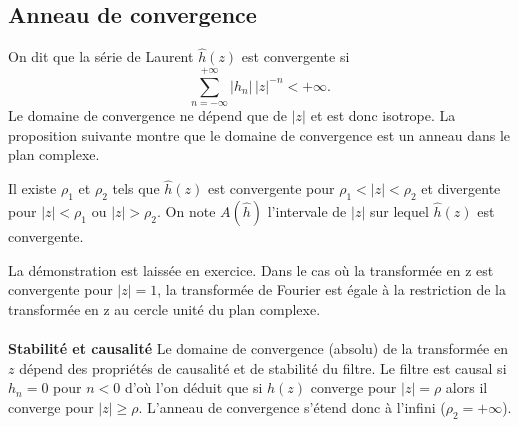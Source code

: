 \subsection{Anneau de convergence}
On dit que la s\'erie de Laurent $\hat h(z)$ est convergente si
\[
\sum_{n=-\infty}^{+\infty} |h_n|\, |z|^{-n} < + \infty .
\]
Le domaine de convergence ne d\'epend que de $|z|$ et est donc
isotrope. La proposition suivante
montre
que le domaine de convergence est un anneau dans le plan complexe.

\begin{proposition}
\label{conv-z}
Il existe $\rho_1$
et $\rho_2$ tels que $\hat h(z)$ est convergente
pour $\rho_1 < |z| < \rho_2$ et divergente
pour $|z| < \rho_1$ ou $|z| > \rho_2$.
On note $A(\hat h)$ l'intervale de $|z|$ sur lequel $\hat h(z)$
est convergente.
\end{proposition}

La d\'emonstration est laiss\'ee en exercice.
Dans le cas o\`u la transform\'ee en z est convergente pour
$|z| = 1$, la transform\'ee de Fourier est \'egale \`a
la restriction
de la transform\'ee en z au cercle unit\'e du plan complexe.
\\
\\
{\bf Stabilit\'e et causalit\'e} Le domaine de convergence (absolu)
de la transform\'ee en $z$ d\'epend des
propri\'et\'es de causalit\'e et de stabilit\'e du filtre.
Le filtre est causal si
$h_n = 0$ pour $n < 0$ d'o\`u l'on d\'eduit que si
$\hat h (z)$ converge pour $|z| = \rho$ alors il converge pour
$|z| \geq \rho$. L'anneau de convergence s'\'etend donc \`a l'infini
($\rho_2 = +\infty$).

